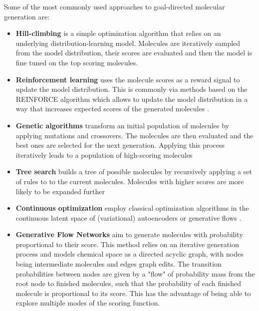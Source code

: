 Some of the most commonly used approaches to goal-directed molecular generation are:
\begin{itemize}
      \item \textbf{Hill-climbing}
            \citep{seglerGeneratingFocusedMolecule2018,xieMARSMarkovMolecular2021,thomasAugmentedHillClimbIncreases2022} is a simple
            optimization algorithm that relies on an underlying distribution-learning model.
            Molecules are iteratively sampled from the model distribution, their scores are
            evaluated and then the model is fine tuned on the top scoring molecules.
      \item \textbf{Reinforcement learning} uses the molecule scores as a reward signal to update
            the model distribution. This is commonly via methods based on the REINFORCE algorithm
            \citep{williamsSimpleStatisticalGradientfollowing1992} which allows to update the model
            distribution in a way that increases expected scores of the generated molecules
            \citep{olivecronaMolecularDenovoDesign2017,thomasAugmentedHillClimbIncreases2022,youGraphConvolutionalPolicy2019,guoAugmentedMemoryCapitalizing2023}.
      \item \textbf{Genetic algorithms} transform an initial population of molecules by applying
            mutations and crossovers. The molecules are then evaluated and the best ones are
            selected for the next generation. Applying this process iteratively leads to a
            population of high-scoring molecules \citep{jensenGraphbasedGeneticAlgorithm2019,nigamGenerativeModelsSuperfast2021,yoshikawaPopulationbasedNovoMolecule2018}
      \item \textbf{Tree search} builds a tree of possible molecules by recursively applying a set
            of rules to to the current molecules. Molecules with higher scores are more likely to be
            expanded further \citep{yangChemTSEfficientPython2017,jensenGraphbasedGeneticAlgorithm2019}
      \item \textbf{Continuous optimization} employ classical optimization algorithms in the continuous
            latent space of (variational) autoencoders
            \citep{winterEfficientMultiobjectiveMolecular2019,gomez-bombarelliAutomaticChemicalDesign2018,kusnerGrammarVariationalAutoencoder2017}
            or generative flows \citep{madhawaGraphNVPInvertibleFlow2019}.
      \item \textbf{Generative Flow Networks} \citep{bengioFlowNetworkBased2021} aim to generate
            molecules with probability proportional to their score. This method relies on an
            iterative generation process and models chemical space as a directed acyclic graph, with
            nodes being intermediate molecules and edges graph edits. The transition probabilities
            between nodes are given by a "flow" of probability mass from the root node to finished
            molecules, such that the probability of each finished molecule is proportional to its
            score. This has the advantage of being able to explore multiple modes of the scoring
            function.
\end{itemize}

